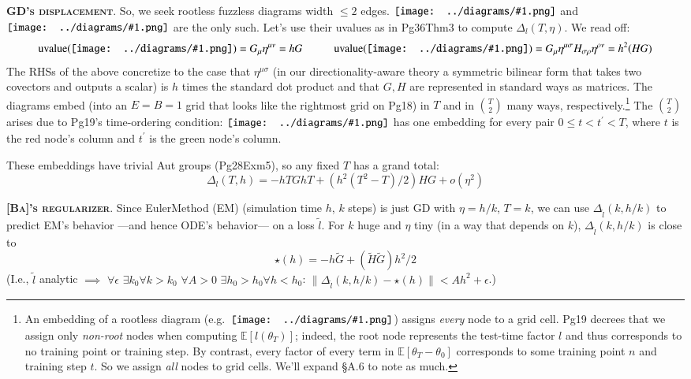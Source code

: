 \documentclass[12pt]{article}
\newcommand{\EE}{\mathbb{E}}
\newcommand{\pag}[1]{\textmd{{\color{gray}Pg}{#1}}}
\newcommand{\thm}[1]{\textmd{{\color{gray}Thm}{#1}}}
\newcommand{\exm}[1]{\textmd{{\color{gray}Exm}{#1}}}
\newcommand{\cit}[1]{[\textbf{#1}]}
\newcommand{\moosect}[1]{\par\noindent\hspace{-1cm}\textsc{\textbf{#1}}.}
\newcommand{\sizeddia}[2]{%
    \begin{gathered}%
        \texttt{[image: ../diagrams/\#1.png]}%
    \end{gathered}%
}
\newcommand{\mdia}[1]{\protect \sizeddia{#1}{0.14}}
\begin{document}
\moosect{GD's displacement}
    So, we seek rootless fuzzless diagrams width $\leq 2$ edges. 
    $\mdia{MOOc(0)(0)}$ and
    $\mdia{MOOc(0-1)(01-1)}$ are the only such.
    Let's use their uvalues as in \pag{36}\thm{3} to compute $\Delta_l(T,\eta)$.
    We read off:
    $$
    \text{uvalue}(\mdia{MOOc(0)(0)}) = G_\mu \eta^{\mu\nu} = h G 
    \hspace{1cm}
    \text{uvalue}(\mdia{MOOc(0-1)(01-1)}) = G_\mu \eta^{\mu\sigma} H_{\sigma\rho} \eta^{\rho\nu} = h^2 (H G)   
    $$
    The RHSs of the above concretize to the case that $\eta^{\mu\sigma}$ (in our
    directionality-aware theory a symmetric bilinear form that takes two covectors and outputs a
    scalar) is $h$ times the standard dot product and that $G, H$ are represented
    in standard ways as matrices.
    The diagrams embed (into an $E=B=1$ grid that looks
    like the rightmost grid on \pag{18}) in $T$ and in ${T\choose 2}$ many
    ways, respectively.\footnote{%
        An embedding of a rootless diagram (e.g.\ $\mdia{MOOc(0-1)(01-1)}$)
        assigns \emph{every} node to a grid cell.  \pag{19}
        decrees that we assign only \emph{non-root} nodes when computing
        $\EE[l(\theta_T)]$; indeed, the root node
        represents the test-time factor $l$ and thus 
        corresponds to no training point or training step.  By contrast,
        every factor of every term in $\EE[\theta_T-\theta_0]$
        corresponds to some training point $n$ and training step $t$.
        So we assign \emph{all} nodes to grid cells.  We'll expand \S{A.6}
        to note as much.
    }  
    The ${T\choose 2}$ arises due to \pag{19}'s
    time-ordering condition: $\mdia{MOOc(0-1)(01-1)}$ has one embedding for
    every pair $0\leq t<t^\prime<T$, where $t$ is the red node's column
    and $t^\prime$ is the green node's column.

    These embeddings have trivial Aut groups
    (\pag{28}\exm{5}), so any fixed $T$ has a grand total:
    $$
        \Delta_l(T,h)
        =
        -hTG
        hT 
        +
        (h^2(T^2-T)/2)
        HG
        +
        o(\eta^2)
    $$

\moosect{\cit{Ba}'s regularizer}
    Since EulerMethod (EM) (simulation time $h$, $k$ steps) 
    is just GD with $\eta=h/k$, $T=k$, we can use $\Delta_{\tilde l}(k,h/k)$ to predict
    EM's behavior ---and hence ODE's behavior---
    on a loss $\tilde l$.
    For $k$ huge and $\eta$ tiny (in a way that depends on $k$),
    $\Delta_{\tilde l}(k,h/k)$ is close to
    $$
        \star(h) = -h\tilde G
        +
        (\tilde H \tilde G)
        h^2/2
    $$
    (I.e., $\tilde l$ analytic $\implies$
    $\forall\epsilon$ $\exists k_0\forall k>k_0$ $\forall A>0$ $\exists h_0>h_0\forall h<h_0$:
        $\|\Delta_{\tilde l}(k,h/k) - \star(h)\| < A h^2 + \epsilon$.)
\end{document}

